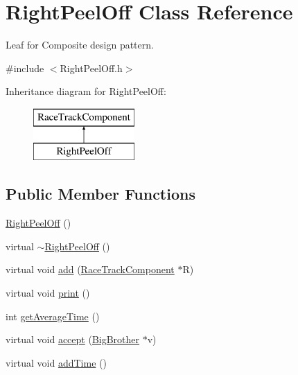 \hypertarget{class_right_peel_off}{}\section{Right\+Peel\+Off Class Reference}
\label{class_right_peel_off}


Leaf for Composite design pattern.  




{\ttfamily \#include $<$Right\+Peel\+Off.\+h$>$}

Inheritance diagram for Right\+Peel\+Off\+:\begin{figure}[H]
\begin{center}
\leavevmode
\includegraphics[height=2.000000cm]{class_right_peel_off}
\end{center}
\end{figure}
\subsection*{Public Member Functions}
\begin{DoxyCompactItemize}
\item 
\mbox{\hyperlink{class_right_peel_off_a04e04180e4adf8b6fbafd75c99007b2a}{Right\+Peel\+Off}} ()
\item 
virtual \mbox{\hyperlink{class_right_peel_off_a5698ead1b07ecf9147f35828e76fe269}{$\sim$\+Right\+Peel\+Off}} ()
\item 
virtual void \mbox{\hyperlink{class_right_peel_off_a6290d2439262a87a6557cd594cc72823}{add}} (\mbox{\hyperlink{class_race_track_component}{Race\+Track\+Component}} $\ast$R)
\item 
virtual void \mbox{\hyperlink{class_right_peel_off_a097f627c43aedcc60c89d2760a67c233}{print}} ()
\item 
int \mbox{\hyperlink{class_right_peel_off_ae18a40aabf89576be0fd9bf244c7c72f}{get\+Average\+Time}} ()
\item 
virtual void \mbox{\hyperlink{class_right_peel_off_a267445b1c690cbba2d737e441bc217d9}{accept}} (\mbox{\hyperlink{class_big_brother}{Big\+Brother}} $\ast$v)
\item 
virtual void \mbox{\hyperlink{class_right_peel_off_aa3097a53c5cf4b01495913cad798c1d4}{add\+Time}} ()
\end{DoxyCompactItemize}
